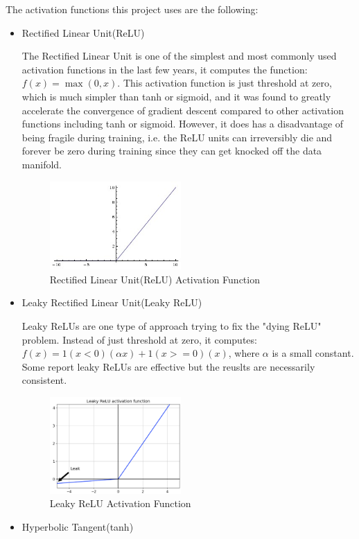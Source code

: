 The activation functions this project uses are the following:
\begin{itemize}
    \item Rectified Linear Unit(ReLU)
    
    The Rectified Linear Unit is one of the simplest and most commonly used activation functions 
    in the last few years, it computes the function: $f(x)=\max(0,x)$. 
    This activation function is just threshold at zero, which is much simpler than tanh or sigmoid, 
    and it was found to greatly accelerate the convergence of gradient descent compared to other 
    activation functions including tanh or sigmoid. However, it does has a disadvantage of being fragile
    during training, i.e. the ReLU units can irreversibly die and forever be zero during training since 
    they can get knocked off the data manifold. 
    \begin{figure}[H]
        \begin{center}
        \includegraphics[width=5cm]{figures/relu}
        \end{center}
        \caption{Rectified Linear Unit(ReLU) Activation Function}
        \label{fig:ReLU}
    \end{figure}
    \item Leaky Rectified Linear Unit(Leaky ReLU)
    
    Leaky ReLUs are one type of approach trying to fix the "dying ReLU" problem. Instead of just threshold 
    at zero, it computes: $f(x)=1(x<0)(\alpha x)+1(x>=0)(x)$, where $\alpha$ is a small constant. Some report 
    leaky ReLUs are effective but the reuslts are necessarily consistent.
    \begin{figure}[H]
        \begin{center}
        \includegraphics[width=5cm]{figures/leakyrelu}
        \end{center}
        \caption{Leaky ReLU Activation Function}
        \label{fig:Leaky ReLU}
    \end{figure}
    \item Hyperbolic Tangent(tanh)
    

\end{itemize}
